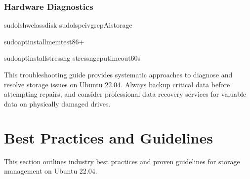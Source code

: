 \documentclass[letterpaper,10pt,english]{sphinxmanual}
\begin{document}
\subsection{Hardware Diagnostics}
\label{\detokenize{troubleshooting:hardware-diagnostics}}
\begin{sphinxVerbatim}[commandchars=\\\{\}]
sudolshw\PYGZhy{}classdisk
sudolspci\PYGZhy{}vgrep\PYGZhy{}A\PYGZhy{}istorage

sudoaptinstallmemtest86+

sudoaptinstallstress\PYGZhy{}ng
stress\PYGZhy{}ng\PYGZhy{}\PYGZhy{}cpu\PYGZhy{}\PYGZhy{}timeout60s
\end{sphinxVerbatim}

\sphinxAtStartPar
This troubleshooting guide provides systematic approaches to diagnose and resolve storage issues on Ubuntu 22.04. Always backup critical data before attempting repairs, and consider professional data recovery services for valuable data on physically damaged drives.

\sphinxstepscope


\chapter{Best Practices and Guidelines}
\label{\detokenize{best-practices:best-practices-and-guidelines}}\label{\detokenize{best-practices::doc}}
\sphinxAtStartPar
This section outlines industry best practices and proven guidelines for storage management on Ubuntu 22.04.
\end{document}
